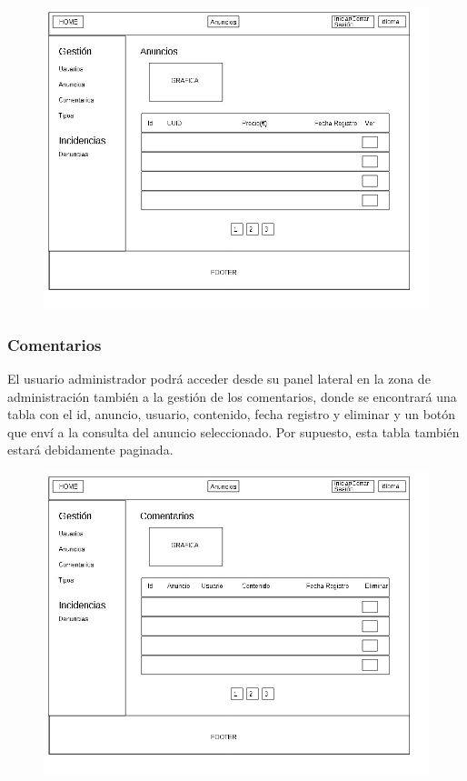 \begin{figure}[h!]
\centering
\includegraphics[width=1\textwidth]{Img/VisionAplicacion/vision_9.jpg}
\end{figure}

\pagebreak
 
\subsubsection{Comentarios}
El usuario administrador podr\'{a} acceder desde su panel lateral en la zona de administraci\'{o}n tambi\'{e}n a la gesti\'{o}n de los comentarios, donde se encontrar\'{a} una tabla con el id, anuncio, usuario, contenido, fecha registro y eliminar y un bot\'{o}n que env\'{i} a la consulta del anuncio seleccionado. Por supuesto, esta tabla tambi\'{e}n estar\'{a} debidamente paginada.

\begin{figure}[h!]
\centering
\includegraphics[width=1\textwidth]{Img/VisionAplicacion/vision_11.jpg}
\end{figure}

